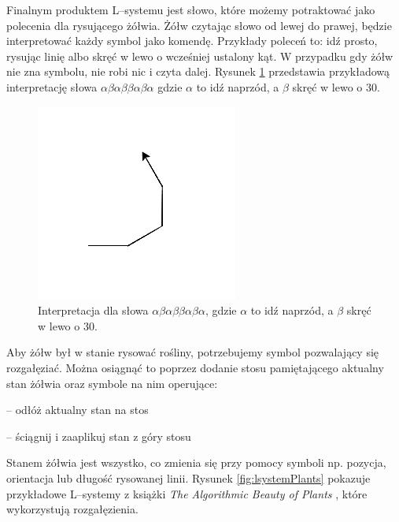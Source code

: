 \documentclass[inz,shortabstract]{iithesis}
\begin{document}
        Finalnym produktem L--systemu jest słowo, które możemy potraktować jako polecenia dla rysującego żółwia. Żółw czytając słowo od lewej do prawej, będzie interpretować każdy symbol jako komendę. Przykłady poleceń to: idź prosto, rysując linię albo skręć w lewo o wcześniej ustalony kąt. W przypadku gdy żółw nie zna symbolu, nie robi nic i czyta dalej. Rysunek \ref{fig:turtleExample} przedstawia przykładową interpretację słowa $\alpha\beta\alpha\beta\beta\alpha\beta\alpha$ gdzie $\alpha$ to idź naprzód, a $\beta$ skręć w lewo o 30\degree.
        \begin{figure}[h]
            \centering
            \includegraphics[width=0.4\linewidth]{turtleExample.png}
            \caption{Interpretacja dla słowa $\alpha\beta\alpha\beta\beta\alpha\beta\alpha$, gdzie $\alpha$ to idź naprzód, a $\beta$ skręć w lewo o 30\degree.}
            \label{fig:turtleExample}
        \end{figure}
        
        Aby żółw był w stanie rysować rośliny, potrzebujemy symbol pozwalający się rozgałęziać. Można osiągnąć to poprzez dodanie stosu pamiętającego aktualny stan żółwia oraz symbole na nim operujące:
        \begin{description}[itemsep=2pt, parsep=2pt, topsep=2pt, partopsep=2pt]
            \item[{[}] -- odłóż aktualny stan na stos
            \item[{]}] -- ściągnij i zaaplikuj stan z góry stosu 
        \end{description}
        Stanem żółwia jest wszystko, co zmienia się przy pomocy symboli np. pozycja, orientacja lub długość rysowanej linii. Rysunek \ref{fig:lsystemPlants} pokazuje przykładowe L--systemy z książki \textit{The Algorithmic Beauty of Plants}  \cite{plants}, które wykorzystują rozgałęzienia. 
        
\end{document}
